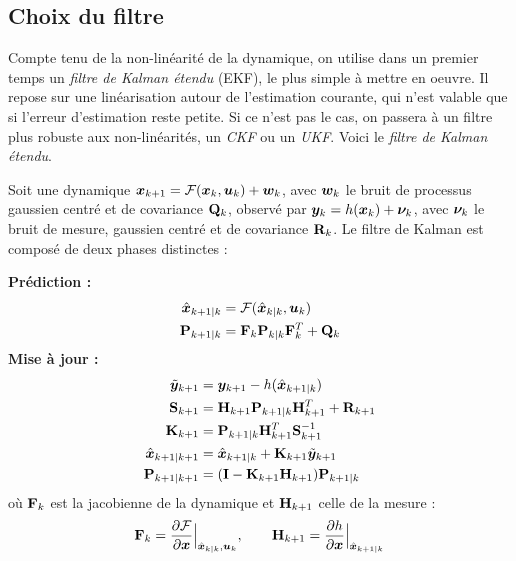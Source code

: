 \subsection{Choix du filtre}
Compte tenu de la non-linéarité de la dynamique, on utilise dans un
premier temps un \emph{filtre de Kalman étendu} (EKF), le plus simple
à mettre en oeuvre. Il repose sur une linéarisation autour de
l'estimation courante, qui n'est valable que si l'erreur d'estimation
reste petite. Si ce n'est pas le cas, on passera à un filtre plus robuste aux non-linéarités, un \emph{CKF} ou un \emph{UKF}. Voici le \emph{filtre de Kalman étendu}.

\begin{definition}
    Soit une dynamique $\bm{x}_{k+1} = \mathcal{F}(\bm{x}_k, \bm{u}_k) + \bm{w}_k$, avec $\bm{w}_k$ le bruit de processus gaussien centré et de covariance $\mathbf{Q}_k$, observé par $\bm{y}_k = h(\bm{x}_k) + \bm{\nu}_k$, avec $\bm{\nu}_k$ le bruit de mesure, gaussien centré et de covariance $\mathbf{R}_k$.
    Le filtre de Kalman est composé de deux phases distinctes :

    \textbf{Prédiction : }
    \begin{align*}
        \hat{\bm{x}}_{k+1|k} &= \mathcal{F}(\hat{\bm{x}}_{k|k}, \bm{u}_k)\\
        \mathbf{P}_{k+1|k} &= \mathbf{F}_k\mathbf{P}_{k|k}\mathbf{F}_k^T + \mathbf{Q}_k
    \end{align*}
    \textbf{Mise à jour : }
    \begin{align*}
        \tilde{\bm{y}}_{k+1} &= \bm{y}_{k+1} - h(\hat{\bm{x}}_{k+1|k})\\
        \mathbf{S}_{k+1} &= \mathbf{H}_{k+1}\mathbf{P}_{k+1|k}\mathbf{H}_{k+1}^T + \mathbf{R}_{k+1}\\
        \mathbf{K}_{k+1} &= \mathbf{P}_{k+1|k}\mathbf{H}_{k+1}^T\mathbf{S}_{k+1}^{-1}\\
        \hat{\bm{x}}_{k+1|k+1} &= \hat{\bm{x}}_{k+1|k} + \mathbf{K}_{k+1}\tilde{\bm{y}}_{k+1}\\
        \mathbf{P}_{k+1|k+1} &= (\mathbf{I} - \mathbf{K}_{k+1}\mathbf{H}_{k+1})\mathbf{P}_{k+1|k}
    \end{align*}
    où $\mathbf{F}_k$ est la jacobienne de la dynamique et $\mathbf{H}_{k+1}$ celle de la mesure :
    \[
        \mathbf{F}_k = \frac{\partial \mathcal{F}}{\partial \bm{x}}\Big|_{\hat{\bm{x}}_{k|k}, \bm{u}_k},
        \qquad
        \mathbf{H}_{k+1} = \frac{\partial h}{\partial \bm{x}}\Big|_{\hat{\bm{x}}_{k+1|k}}
    \]
\end{definition}

